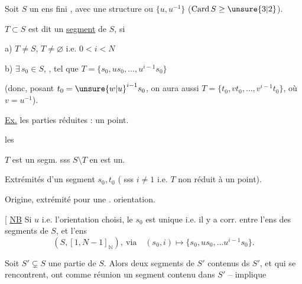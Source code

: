 Soit $S$ un ens fini , avec une structure  ou  $\{u,u^{-1}\}$ ($\mathrm{Card}\,S\geq\unsure{3|2}$).

 $T\subset S$  est dit un  \uline{segment} de $S$, si

a)  $T\ne S$, $T\ne\varnothing$  i.e. $0<i<N$

b) $\exists\,s_0\in S$, , tel que $T=\{s_0,us_0,\ldots,u^{i-1}s_0\}$

(donc, posant $t_0={\unsure{w|u}}^{i-1}s_0$, on aura aussi $T=\{t_0,vt_0,\ldots,v^{i-1}t_0\}$, où $v=u^{-1}$).

\uline{Ex.} les parties réduites : un point.

les 


$T$ est un segm. sss $S\setminus T$ en est un.




Extrémités d'un segment $s_0,t_0$ ( sss $i\ne1$ i.e. $T$ non réduit à un point).

Origine, extrémité pour une . orientation.

[ \uline{NB} Si $u$ i.e. l'orientation choisi, le $s_0$ est unique i.e. il y a corr.  entre l'ens des segments de $S$, et l'ens
\[
 (S,[1,N-1]_{\mathbb N}),\ \text{via}\quad (s_0,i)\longmapsto\{s_0,us_0,\ldots u^{i-1}s_0\}.
\]

Soit $S'\subsetneq S$ une partie de $S$. Alors  deux segments de $S'$ contenus ds $S'$, et qui se rencontrent, ont comme réunion un segment  contenu dans $S'$ --  implique
